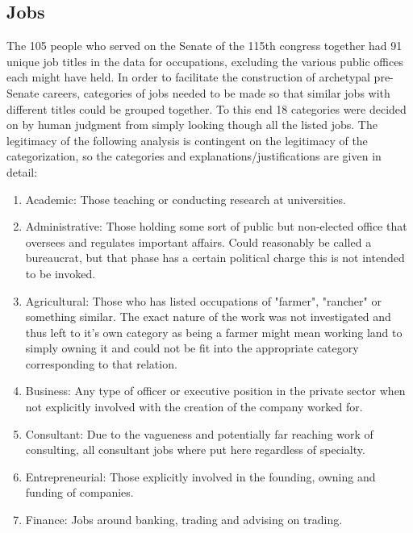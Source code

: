 \documentclass[11pt,twocolumn]{article}
\begin{document}
	\subsection{Jobs}
The 105 people who served on the Senate of the 115th congress together had 91 unique job titles in the data for occupations, excluding the various public offices each might have held. In order to facilitate the construction of archetypal pre-Senate careers, categories of jobs needed to be made so that similar jobs with different titles could be grouped together. To this end 18 categories were decided on by human judgment from simply looking though all the listed jobs. The legitimacy of the following analysis is contingent on the legitimacy of the categorization, so the categories and explanations/justifications are given in detail:

\begin{enumerate}
\item Academic: Those teaching or conducting research at universities.

\item Administrative: Those holding some sort of public but non-elected office that oversees and regulates important affairs. Could reasonably be called a bureaucrat, but that phase has a certain political charge this is not intended to be invoked.

\item Agricultural: Those who has listed occupations of "farmer", "rancher" or something similar. The exact nature of the work was not investigated and thus left to it's own category as being a farmer might mean working land to simply owning it and could not be fit into the appropriate category corresponding to that relation.

\item Business: Any type of officer or executive position in the private sector when not explicitly involved with the creation of the company worked for.

\item Consultant: Due to the vagueness and potentially far reaching work of consulting, all consultant jobs where put here regardless of specialty.

\item Entrepreneurial: Those explicitly involved in the founding, owning and funding of companies.

\item Finance: Jobs around banking, trading and advising on trading.


\end{enumerate}
\end{document}
